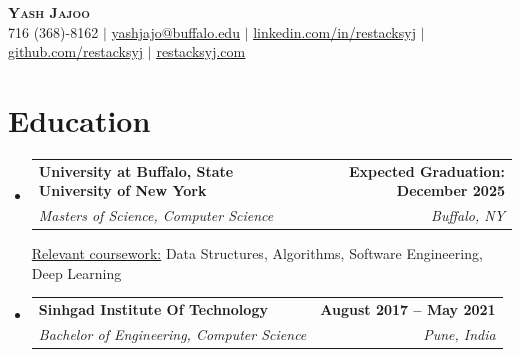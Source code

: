 \documentclass[letterpaper,11pt]{article}
\makeatletter
\newcommand{\resumeSubheading}[4]{
  \vspace{-2pt}\item
    \begin{tabular*}{0.97\textwidth}[t]{l@{\extracolsep{\fill}}r}
        \textbf{#1} & \textbf{#2} \\
      \textit{\small#3} & \textit{\small #4} \\
    \end{tabular*}\vspace{-7pt}
}
\newcommand{\resumeSubheadingTwo}[5]{
  \vspace{-2pt}\item
    \begin{tabular*}{0.97\textwidth}[t]{l@{\extracolsep{\fill}}r}
        \textbf{#1} & \textbf{#2} \\
      \textit{\small#3} & \textit{\small #4} \\
    \end{tabular*}
      {\small#5} 
}
\newcommand{\resumeSubHeadingListStart}{\begin{itemize}[leftmargin=0.15in, label={}]}
\newcommand{\resumeSubHeadingListEnd}{\end{itemize}}
\makeatother
\begin{document}

\begin{center}
    \textbf{\Huge \scshape Yash Jajoo} \\ \vspace{1pt}
    \small 716 (368)-8162 $|$ \href{mailto:yashjajo@buffalo.edu}{\underline{yashjajo@buffalo.edu}} $|$ 
    \color{blue}\href{https://linkedin.com/in/restacksyj}{\underline{linkedin.com/in/restacksyj}} $|$
    \href{https://github.com/restacksyj}{\underline{github.com/restacksyj}} $|$
    \href{https://restacksyj.com}{\underline{restacksyj.com}} 
\end{center}


\section{Education}
  \resumeSubHeadingListStart
    \resumeSubheadingTwo
      {University at Buffalo, State University of New York}{Expected Graduation: December 2025}
      {Masters of Science, Computer Science}{Buffalo, NY}
      {\underline{Relevant coursework:} Data Structures, Algorithms, Software Engineering, Deep Learning}
    \resumeSubheading
      {Sinhgad Institute Of Technology}{August 2017 -- May 2021}
      {Bachelor of Engineering, Computer Science}{Pune, India}
  \resumeSubHeadingListEnd


\end{document}
